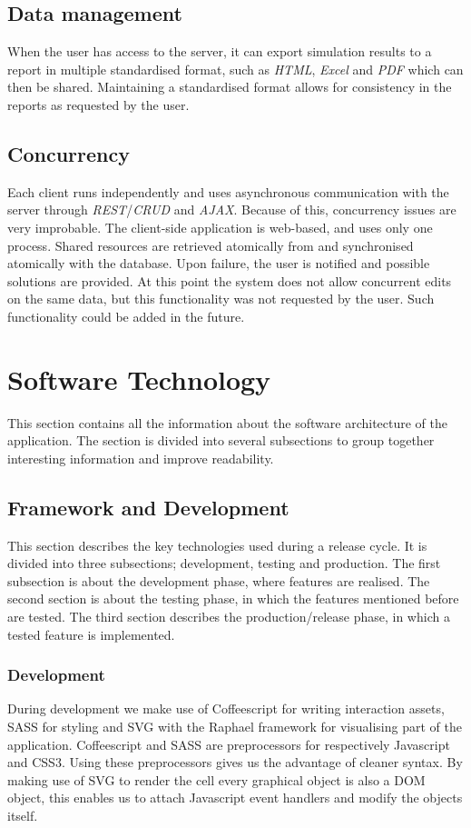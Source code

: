 \documentclass{report}
\begin{document}
		\subsection{Data management}
			When the user has access to the server, it can export simulation results to a report in multiple standardised format, such as \emph{HTML}, \emph{Excel} and \emph{PDF} which can then be shared. Maintaining a standardised format allows for consistency in the reports as requested by the user.		
	
		\subsection{Concurrency}
			Each client runs independently and uses asynchronous communication with the server through \emph{REST}/\emph{CRUD} and \emph{AJAX}. Because of this, concurrency issues are very improbable. The client-side application is web-based, and uses only one process. Shared resources are retrieved atomically from and synchronised atomically with the database. Upon failure, the user is notified and possible solutions are provided. At this point the system does not allow concurrent edits on the same data, but this functionality was not requested by the user. Such functionality could be added in the future.\\		
			
	\clearpage
	\section{Software Technology}
		This section contains all the information about the software architecture of the application. The section is divided into several subsections to group together interesting information and improve readability.	
		
		\subsection{Framework and Development}
			This section describes the key technologies used during a release cycle.
			It is divided into three subsections; development, testing and production.
			The first subsection is about the development phase, where features are realised.
			The second section is about the testing phase, in which the features mentioned before are tested.
			The third section describes the production/release phase, in which a tested feature is implemented.
			
			\subsubsection{Development}
				During development we make use of Coffeescript\cite{coffeescript} for writing interaction assets, SASS\cite{sass} for styling and SVG\cite{svg} with the Raphael\cite{raphael} framework for visualising part of the application.
				Coffeescript and SASS are preprocessors for respectively Javascript and CSS3. Using these preprocessors gives us the advantage of cleaner syntax.
				By making use of SVG to render the cell every graphical object is also a DOM object, this enables us to attach Javascript event handlers and modify the objects itself.
				
\end{document}
